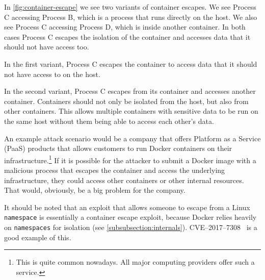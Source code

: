 In \autoref{fig:container-escape} we see two variants of container escapes. We see Process C accessing Process B, which is a process that runs directly on the host. We also see Process C accessing Process D, which is inside another container. In both cases Process C escapes the isolation of the container and accesses data that it should not have access too.

In the first variant, Process C escapes the container to access data that it should not have access to on the host.

In the second variant, Process C escapes from its container and accesses another container. Containers should not only be isolated from the host, but also from other containers. This allows multiple containers with sensitive data to be run on the same host without them being able to access each other's data.

\medskip

An example attack scenario would be a company that offers Platform as a Service (PaaS) products that allows customers to run Docker containers on their infrastructure.\footnote{This is quite common nowadays. All major computing providers offer such a service.} If it is possible for the attacker to submit a Docker image with a malicious process that escapes the container and access the underlying infrastructure, they could access other containers or other internal resources. That would, obviously, be a big problem for the company.

\medskip

It should be noted that an exploit that allows someone to escape from a Linux \lstinline{namespace} is essentially a container escape exploit, because Docker relies heavily on \lstinline{namespaces} for isolation (see \autoref{subsubsection:internals}). CVE--2017--7308~\cite{CVE-2017-7308} is a good example of this.
